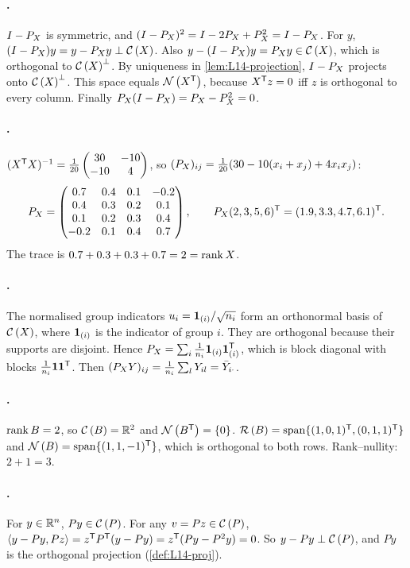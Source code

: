 \paragraph{.}
$I-P_X$ is symmetric, and $(I-P_X)^2=I-2P_X+P_X^2=I-P_X$. For $y$, $(I-P_X)y=y-P_X y\perp\mathcal{C}\left(X\right)$. Also
$y-(I-P_X)y=P_X y\in\mathcal{C}\left(X\right)$, which is orthogonal to $\mathcal{C}\left(X\right)^\perp$. By uniqueness in \cref{lem:L14-projection},
$I-P_X$ projects onto $\mathcal{C}\left(X\right)^\perp$. This space equals $\mathcal{N}\left(X^{\mathsf T}\right)$, because $X^{\mathsf T} z=0$ iff $z$ is orthogonal to every
column. Finally $P_X(I-P_X)=P_X-P_X^2=0$.

\paragraph{.}
$(X^{\mathsf T} X)^{-1}=\frac1{20}\begin{pmatrix}30&-10\\-10&4\end{pmatrix}$, so $(P_X)_{ij}=\frac1{20}(30-10(x_i+x_j)+4x_ix_j)$:
\[
P_X=\begin{pmatrix}0.7&0.4&0.1&-0.2\\0.4&0.3&0.2&0.1\\0.1&0.2&0.3&0.4\\-0.2&0.1&0.4&0.7\end{pmatrix},
\qquad P_X(2,3,5,6)^{\mathsf T}=(1.9,3.3,4.7,6.1)^{\mathsf T} .
\]
The trace is $0.7+0.3+0.3+0.7=2=\operatorname{rank} X$.

\paragraph{.}
The normalised group indicators $u_i=\mathbf 1_{(i)}/\sqrt{n_i}$ form an orthonormal basis of $\mathcal{C}\left(X\right)$, where $\mathbf 1_{(i)}$ is the
indicator of group $i$. They are orthogonal because their supports are disjoint. Hence
$P_X=\sum_i\frac1{n_i}\mathbf 1_{(i)}\mathbf 1_{(i)}^{\mathsf T}$, which is block diagonal with blocks $\frac1{n_i}\mathbf 1\mathbf 1^{\mathsf T}$. Then
$(P_X Y)_{ij}=\frac1{n_i}\sum_lY_{il}=\bar Y_{i\cdot}$.

\paragraph{.}
$\operatorname{rank} B=2$, so $\mathcal{C}\left(B\right)=\mathbb R^2$ and $\mathcal{N}\left(B^{\mathsf T}\right)=\{0\}$. $\mathcal{R}\left(B\right)=\mathrm{span}\{(1,0,1)^{\mathsf T},(0,1,1)^{\mathsf T}\}$ and
$\mathcal{N}\left(B\right)=\mathrm{span}\{(1,1,-1)^{\mathsf T}\}$, which is orthogonal to both rows. Rank--nullity: $2+1=3$.

\paragraph{.}
For $y\in\mathbb R^n$, $Py\in\mathcal{C}\left(P\right)$. For any $v=Pz\in\mathcal{C}\left(P\right)$,
$\langle y-Py,Pz\rangle=z^{\mathsf T} P^{\mathsf T}(y-Py)=z^{\mathsf T}(Py-P^2y)=0$. So $y-Py\perp\mathcal{C}\left(P\right)$, and $Py$ is the orthogonal projection
(\cref{def:L14-proj}).
